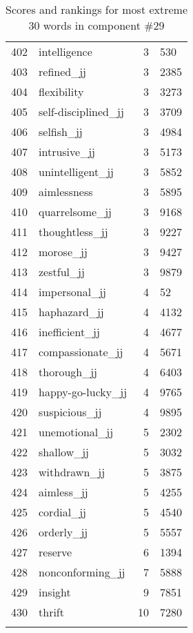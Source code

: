 \begin{longtable}[!htbp]{| rlr@{.}l |}
    402 & intelligence & 3 & 530 \\
    403 & refined\_jj & 3 & 2385 \\
    404 & flexibility & 3 & 3273 \\
    405 & self-disciplined\_jj & 3 & 3709 \\
    406 & selfish\_jj & 3 & 4984 \\
    407 & intrusive\_jj & 3 & 5173 \\
    408 & unintelligent\_jj & 3 & 5852 \\
    409 & aimlessness & 3 & 5895 \\
    410 & quarrelsome\_jj & 3 & 9168 \\
    411 & thoughtless\_jj & 3 & 9227 \\
    412 & morose\_jj & 3 & 9427 \\
    413 & zestful\_jj & 3 & 9879 \\
    414 & impersonal\_jj & 4 & 52 \\
    415 & haphazard\_jj & 4 & 4132 \\
    416 & inefficient\_jj & 4 & 4677 \\
    417 & compassionate\_jj & 4 & 5671 \\
    418 & thorough\_jj & 4 & 6403 \\
    419 & happy-go-lucky\_jj & 4 & 9765 \\
    420 & suspicious\_jj & 4 & 9895 \\
    421 & unemotional\_jj & 5 & 2302 \\
    422 & shallow\_jj & 5 & 3032 \\
    423 & withdrawn\_jj & 5 & 3875 \\
    424 & aimless\_jj & 5 & 4255 \\
    425 & cordial\_jj & 5 & 4540 \\
    426 & orderly\_jj & 5 & 5557 \\
    427 & reserve & 6 & 1394 \\
    428 & nonconforming\_jj & 7 & 5888 \\
    429 & insight & 9 & 7851 \\
    430 & thrift & 10 & 7280 \\
    \hline
    \caption{Scores and rankings for most extreme 30 words in component \#29} \\
\end{longtable}
